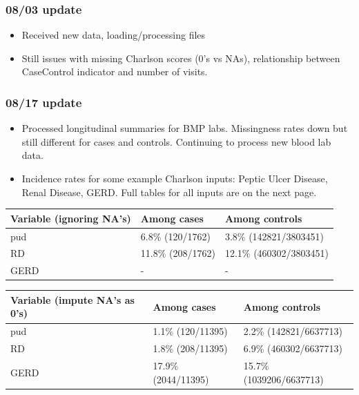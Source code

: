 \documentclass[12pt]{article}
\begin{document}
\pagebreak

\subsubsection*{08/03 update}

\begin{itemize}
  \item Received new data, loading/processing files
  \item Still issues with missing Charlson scores (0's vs NAs), relationship between CaseControl indicator and number of visits.
\end{itemize}

\pagebreak

\subsubsection*{08/17 update}

\begin{itemize}
  \item Processed longitudinal summaries for BMP labs. Missingness rates down but still different for cases and controls. Continuing to process new blood lab data.
  \item Incidence rates for some example Charlson inputs: Peptic Ulcer Disease, Renal Disease, GERD. Full tables for all inputs are on the next page.
\end{itemize}


\begin{center}
\begin{tabular}{|l|l|l|}
  \hline
Variable {\bf (ignoring NA's)} & Among cases & Among controls \\ \hline
pud                     & 6.8\% (120/1762)            & 3.8\% (142821/3803451)               \\ \hline
RD                      & 11.8\% (208/1762)            & 12.1\% (460302/3803451)               \\ \hline
GERD                    & -             & - \\ \hline
\end{tabular}

\begin{tabular}{|l|l|l|}
  \hline
Variable {\bf (impute NA's as 0's)} & Among cases & Among controls \\ \hline
pud                     & 1.1\% (120/11395)            & 2.2\% (142821/6637713)               \\ \hline
RD                      & 1.8\% (208/11395)            & 6.9\% (460302/6637713)                \\ \hline
GERD                    & 17.9\% (2044/11395)            &  15.7\% (1039206/6637713) \\ \hline
\end{tabular}
\end{center}
\end{document}
